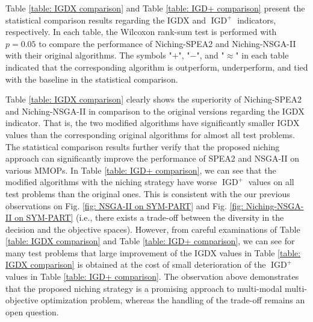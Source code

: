Table \ref{table: IGDX comparison} and Table \ref{table: IGD+ comparison} present the statistical comparison results regarding the IGDX and $\operatorname{IGD}^+$ indicators, respectively. In each table, the Wilcoxon rank-sum test is performed with $p=0.05$ to compare the performance of Niching-SPEA2 and Niching-NSGA-II with their original algorithms. The symbols "$+$", "$-$", and "$\approx$" in each table indicated that the corresponding algorithm is outperform, underperform, and tied with the baseline in the statistical comparison.

Table \ref{table: IGDX comparison} clearly shows the superiority of Niching-SPEA2 and Niching-NSGA-II in comparison to the original versions regarding the IGDX indicator. That is, the two modified algorithms have significantly smaller IGDX values than the corresponding original algorithms for almost all test problems. The statistical comparison results further verify that the proposed niching approach can significantly improve the performance of SPEA2 and NSGA-II on various MMOPs. In Table \ref{table: IGD+ comparison}, we can see that the modified algorithms with the niching strategy have worse $\operatorname{IGD}^+$ values on all test problems than the original ones. This is consistent with the our previous observations on Fig. \ref{fig: NSGA-II on SYM-PART} and Fig. \ref{fig: Niching-NSGA-II on SYM-PART} (i.e., there exists a trade-off between the diversity in the decision and the objective spaces). However, from careful examinations of Table \ref{table: IGDX comparison} and Table \ref{table: IGD+ comparison}, we can see for many test problems that large improvement of the IGDX values in Table \ref{table: IGDX comparison} is obtained at the cost of small deterioration of the $\operatorname{IGD}^+$ values in Table \ref{table: IGD+ comparison}. The observation above demonstrates that the proposed niching strategy is a promising approach to multi-modal multi-objective optimization problem, whereas the handling of the trade-off remains an open question.